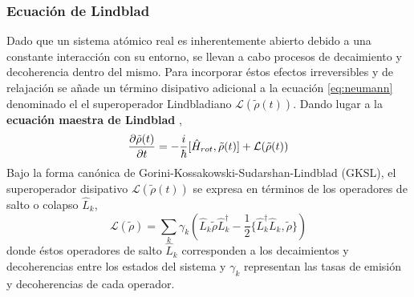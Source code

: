 \subsubsection*{Ecuación de Lindblad}
Dado que un sistema atómico real es inherentemente abierto debido a una constante interacción con su entorno, se llevan a cabo procesos de decaimiento y decoherencia dentro del mismo. Para incorporar éstos efectos irreversibles y de relajación se añade un término disipativo adicional a la ecuación \ref{eq:neumann} denominado el el superoperador Lindbladiano $\mathcal{L}(\tilde{\rho}(t))$. Dando lugar a la \textbf{ecuación maestra de Lindblad} \cite{lindbladGeneratorsQuantumDynamical1976,keaveneyAtomLightInteractions2014},
\begin{equation}
    \pdv{\tilde{\rho}(t)}{t}  = -\frac{i}{\hbar} [\hat{H}_{rot}, \tilde{\rho}(t)] + \mathcal{L}(\tilde{\rho}(t))
    \label{eq:lindblad}
\end{equation}
Bajo la forma canónica de Gorini-Kossakowski-Sudarshan-Lindblad (GKSL), el superoperador disipativo $\mathcal{L}(\tilde{\rho}(t))$ se expresa en términos de los operadores de salto o colapso $\hat{L}_k$,
\begin{equation*}
    \mathcal{L}(\tilde{\rho}) = \sum_k \gamma_k \left( \hat{L}_k \tilde{\rho} \hat{L}_k^{\dagger} - \frac{1}{2} \{\hat{L}_k^{\dagger} \hat{L}_k, \tilde{\rho}\} \right)
\end{equation*}
donde éstos operadores de salto $\hat{L}_k$ corresponden a los decaimientos y decoherencias entre los estados del sistema y $\gamma_k$ representan las tasas de emisión y decoherencias de cada operador.


